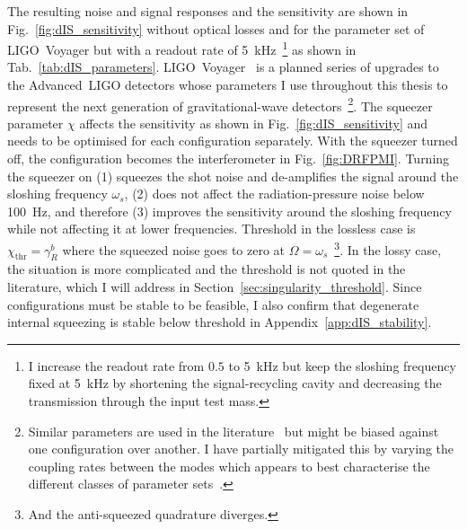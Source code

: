 The resulting noise and signal responses and the sensitivity are shown in Fig.~\ref{fig:dIS_sensitivity} without optical losses and for the parameter set of LIGO~Voyager but with a readout rate of 5~kHz~\footnote{I increase the readout rate from $0.5$ to 5~kHz but keep the sloshing frequency fixed at 5~kHz by shortening the signal-recycling cavity and decreasing the transmission through the input test mass.} as shown in Tab.~\ref{tab:dIS_parameters}.
LIGO~Voyager~\cite{} is a planned series of upgrades to the Advanced~LIGO detectors whose parameters I use throughout this thesis to represent the next generation of gravitational-wave detectors~\footnote{Similar parameters are used in the literature~\cite{liBroadbandSensitivityImprovement2020,miaoDesignGravitationalWaveDetectors2018,korobkoQuantumExpanderGravitationalwave2019,} but might be biased against one configuration over another. I have partially mitigated this by varying the coupling rates between the modes which appears to best characterise the different classes of parameter sets~\cite{}.}.
The squeezer parameter $\chi$ affects the sensitivity as shown in Fig.~\ref{fig:dIS_sensitivity} and needs to be optimised for each configuration separately. With the squeezer turned off, the configuration becomes the interferometer in Fig.~\ref{fig:DRFPMI}. %
Turning the squeezer on (1) squeezes the shot noise and de-amplifies the signal around the sloshing frequency $\omega_s$, (2) does not affect the radiation-pressure noise below 100~Hz, and therefore (3) improves the sensitivity around the sloshing frequency while not affecting it at lower frequencies. 
Threshold in the lossless case is $\chi_\text{thr}=\gamma^b_R$ where the squeezed noise goes to zero at $\Omega=\omega_s$~\footnote{And the anti-squeezed quadrature diverges.}. In the lossy case, the situation is more complicated and the threshold is not quoted in the literature, which I will address in Section~\ref{sec:singularity_threshold}. Since configurations must be stable to be feasible, I also confirm that degenerate internal squeezing is stable below threshold in Appendix~\ref{app:dIS_stability}.
